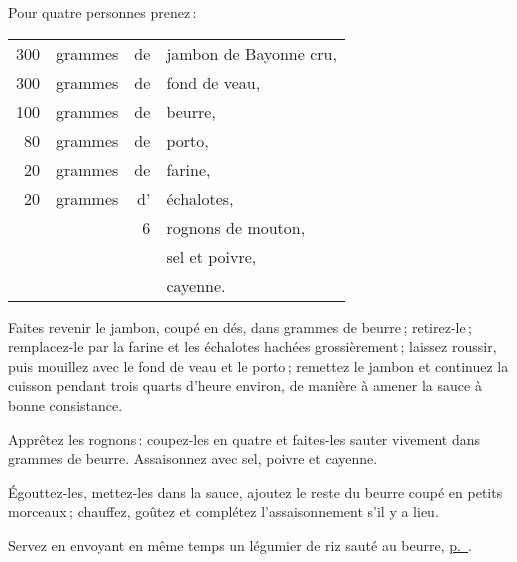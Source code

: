 Pour quatre personnes prenez :

\medskip

\footnotesize
\begin{longtable}{rrrp{18em}}
    300 & grammes & de & jambon de Bayonne cru,                                                           \\
    300 & grammes & de & fond de veau,                                                                    \\
    100 & grammes & de & beurre,                                                                          \\
     80 & grammes & de & porto,                                                                           \\
     20 & grammes & de & farine,                                                                          \\
     20 & grammes & d' & échalotes,                                                                       \\
        &         &  6 & rognons de mouton,                                                               \\
        &         &    & sel et poivre,                                                                   \\
        &         &    & cayenne.                                                                         \\
\end{longtable}
\normalsize

Faites revenir le jambon, coupé en dés, dans {\mmm} grammes de beurre ;
retirez-le ; remplacez-le par la farine et les échalotes hachées
grossièrement ; laissez roussir, puis mouillez avec le fond de veau et le
porto ; remettez le jambon et continuez la cuisson pendant trois quarts d'heure
environ, de manière à amener la sauce à bonne consistance.

Apprêtez les rognons : coupez-les en quatre et faites-les sauter vivement dans
{\mmm} grammes de beurre. Assaisonnez avec sel, poivre et cayenne.

Égouttez-les, mettez-les dans la sauce, ajoutez le reste du beurre coupé en
petits morceaux ; chauffez, goûtez et complétez l’assaisonnement s'il y a lieu.

Servez en envoyant en même temps un légumier de riz sauté au beurre,
\hyperlink{p0710}{p. \pageref{pg0710}}.

\sk

